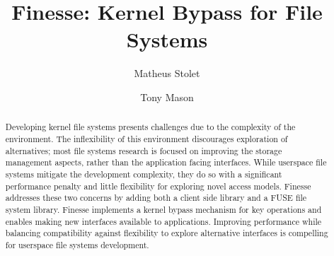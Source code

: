\documentclass[sigplan,10pt,letter,plain]{acmart}
\begin{document}
\title{Finesse: Kernel Bypass for File Systems}


\author{Matheus Stolet}
\author{Tony Mason}

\renewcommand{\shortauthors}{M. Stolet et al.}

\begin{abstract}
  Developing kernel file systems presents challenges due to the complexity of the environment.  The inflexibility of this environment discourages exploration of alternatives; most file systems research is focused on improving the storage management aspects, rather than the application facing interfaces.  While userspace file systems mitigate the development complexity, they do so with a significant performance penalty and little flexibility for exploring novel access models.  Finesse addresses these two concerns by adding both a client side library and a FUSE file system library.  Finesse implements a kernel bypass mechanism for key operations and enables making new interfaces available to applications.  Improving performance while balancing compatibility against flexibility to explore alternative interfaces is compelling for userspace file systems development.
\end{abstract}


\maketitle
\end{document}
